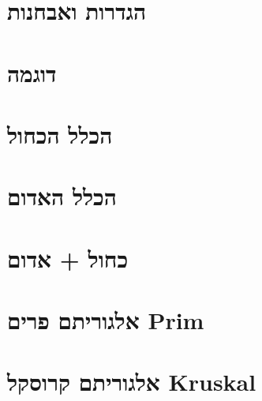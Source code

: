 \documentclass[]{article}
\def\insert#1{}
\begin{document}
\def\lecnum{4}
\def\topcis{
עץ פורש מינימלי
}

\section*{הגדרות ואבחנות}
\insert{preliminary}
\section*{דוגמה}
\insert{example}
\section*{הכלל הכחול}
\insert{blue}
\section*{הכלל האדום}
\insert{red}
\section*{כחול + אדום}
\insert{bluered}
\section*{אלגוריתם פרים
\textenglish{Prim}
}
\insert{prim}
\section*{אלגוריתם קרוסקל
\textenglish{Kruskal}
}
\insert{kruskal}
\end{document}
